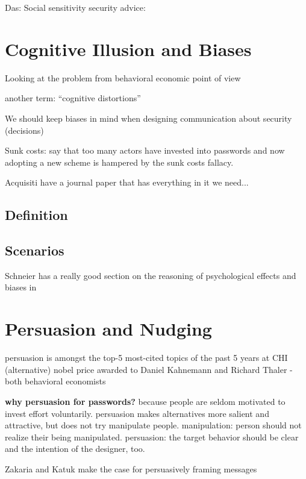 Das: Social sensitivity security advice: \cite{Das2014EffectSocialInfluenceSecuritySensitivity}

\section{Cognitive Illusion and Biases}
Looking at the problem from behavioral economic point of view

another term: ``cognitive distortions''

We should keep biases in mind when designing communication about security (decisions) \cite{Garg2013HeuristicsAndBiases}

Sunk costs: \cite{Herley2012PersistenceOfPasswords} say that too many actors have invested into passwords and now adopting a new scheme is hampered by the sunk costs fallacy.


Acquisiti \etal \cite{Acquisti2017NudgesPrivacySecurity} have a journal paper that has everything in it we need...
	\subsection{Definition}
	\subsection{Scenarios}
	
	
	

Schneier has a really good section on the reasoning of psychological effects and biases in \cite{Schneier2008PsychologySecurity} 
	
	
\section{Persuasion and Nudging}

persuasion is amongst the top-5 most-cited topics of the past 5 years at CHI
(alternative) nobel price awarded to Daniel Kahnemann and Richard Thaler - both behavioral economists

\textbf{why persuasion for passwords?} because people are seldom motivated to invest effort voluntarily. persuasion makes alternatives more salient and attractive, but does not try manipulate people. manipulation: person should not realize their being manipulated. persuasion: the target behavior should be clear and the intention of the designer, too. 

\cite{Zakaria2013DesigningEffectiveSecurityMessages} Zakaria and Katuk make the case for persuasively framing messages


